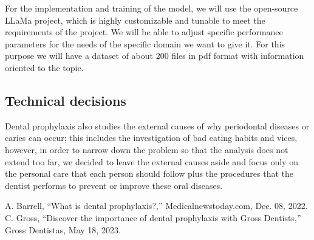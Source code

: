 \documentclass[conference]{IEEEtran}
\begin{document}
For the implementation and training of the model, we will use the open-source LLaMa project, which is highly customizable and tunable to meet the requirements of the project. We will be able to adjust specific performance parameters for the needs of the specific domain we want to give it. For this purpose we will have a dataset of about 200 files in pdf format with information oriented to the topic.

\subsection{Technical decisions}

Dental prophylaxis also studies the external causes of why periodontal diseases or caries can occur; this includes the investigation of bad eating habits and vices, however, in order to narrow down the problem so that the analysis does not extend too far, we decided to leave the external causes aside and focus only on the personal care that each person should follow plus the procedures that the dentist performs to prevent or improve these oral diseases.

\begin{thebibliography}{00}
 A. Barrell, “What is dental prophylaxis?,” Medicalnewstoday.com, Dec. 08, 2022.
 C. Gross, “Discover the importance of dental prophylaxis with Gross Dentists,” Gross Dentistas, May 18, 2023.
\end{thebibliography}
\end{document}
